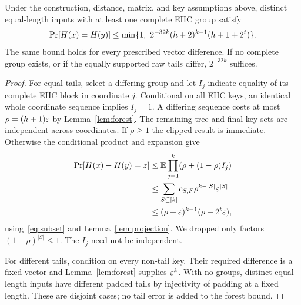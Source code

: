 \begin{theorem}\label{thm:main}
Under the construction, distance, matrix, and key assumptions above, distinct equal-length inputs with at least one complete EHC group satisfy
\begin{equation}\label{eq:main}
 \mathop{\rm Pr}[H(x)=H(y)]\le
 \min\{1,\ 2^{-32k}(h+2)^{k-1}(h+1+2^t)\}.
\end{equation}
The same bound holds for every prescribed vector difference. If no complete group exists, or if the equally supported raw tails differ, $2^{-32k}$ suffices.
\end{theorem}
\begin{proof}
For equal tails, select a differing group and let $I_j$ indicate equality of its complete EHC block in coordinate $j$. Conditional on all EHC keys, an identical whole coordinate sequence implies $I_j=1$. A differing sequence costs at most $\rho=(h+1)\varepsilon$ by Lemma~\ref{lem:forest}. The remaining tree and final key sets are independent across coordinates. If $\rho\ge1$ the clipped result is immediate. Otherwise the conditional product and expansion give
\begin{align*}
 \mathop{\rm Pr}[H(x)-H(y)=z]
 &\le\mathbb E\prod_{j=1}^k(\rho+(1-\rho)I_j)\\
 &\le\sum_{S\subseteq[k]}c_{S,F}\rho^{k-|S|}\varepsilon^{|S|}\\
 &\le(\rho+\varepsilon)^{k-1}(\rho+2^t\varepsilon),
\end{align*}
using~\eqref{eq:subset} and Lemma~\ref{lem:projection}. We dropped only factors $(1-\rho)^{|S|}\le1$. The $I_j$ need not be independent.

For different tails, condition on every non-tail key. Their required difference is a fixed vector and Lemma~\ref{lem:forest} supplies $\varepsilon^k$. With no groups, distinct equal-length inputs have different padded tails by injectivity of padding at a fixed length. These are disjoint cases; no tail error is added to the forest bound.
\end{proof}

